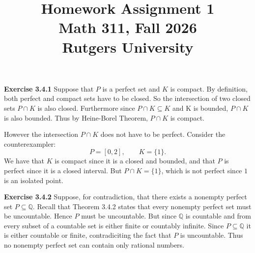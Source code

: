 \documentclass[12pt]{article}
\title{Homework Assignment 1 \\ \large Math 311, Fall 2026 \\ Rutgers University}
\author{}
\date{}
\begin{document}
\maketitle

\textbf{Exercise 3.4.1}
Suppose that \( P \) is a perfect set and \( K \) is compact.
By definition, both perfect and compact sets have to be closed.
So the intersection of two closed sets \( P \cap K \) is also closed.
Furthermore since \( P \cap K \subseteq K \) and K is bounded, \( P \cap K \) is also bounded. Thus by Heine-Borel Theorem, \( P \cap K \) is compact.

However the intersection \( P \cap K \) does not have to be perfect.
Consider the counterexampler:
\[
    P = [0,2], \qquad K = \{1\}.
\]
We have that \( K \) is compact since it is a closed and bounded, and
that \( P \) is perfect since it is a closed interval.
But \( P \cap K = \{1\} \), which is not perfect since \( 1 \) is an isolated point.

\textbf{Exercise 3.4.2}
Suppose, for contradiction, that there exists a nonempty perfect set \( P \subseteq \mathbb{Q} \). Recall that Theorem 3.4.2 states that every nonempty perfect set must be uncountable. Hence \( P \) must be uncountable. But since \( \mathbb{Q} \) is countable and from every subset of a countable set is either finite or countably infinite. Since \( P \subseteq \mathbb{Q} \) it is either countable or finite, contradiciting the fact that \( P \) is uncountable. Thus no nonempty perfect set can contain only rational numbers.
\end{document}

